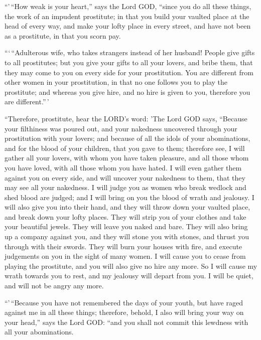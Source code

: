  ``'\,``How weak is your heart,'' says the Lord GOD,
``since you do all these things, the work of an impudent prostitute;
 in that you build your vaulted place at the head of
every way, and make your lofty place in every street, and have not been
as a prostitute, in that you scorn pay.

 ```\,``Adulterous wife, who takes strangers instead of
her husband!  People give gifts to all prostitutes; but
you give your gifts to all your lovers, and bribe them, that they may
come to you on every side for your prostitution.  You are
different from other women in your prostitution, in that no one follows
you to play the prostitute; and whereas you give hire, and no hire is
given to you, therefore you are different.''\,'

 ``Therefore, prostitute, hear the LORD's word:
 'The Lord GOD says, ``Because your filthiness was poured
out, and your nakedness uncovered through your prostitution with your
lovers; and because of all the idols of your abominations, and for the
blood of your children, that you gave to them;  therefore
see, I will gather all your lovers, with whom you have taken pleasure,
and all those whom you have loved, with all those whom you have hated. I
will even gather them against you on every side, and will uncover your
nakedness to them, that they may see all your nakedness. 
I will judge you as women who break wedlock and shed blood are judged;
and I will bring on you the blood of wrath and jealousy. 
I will also give you into their hand, and they will throw down your
vaulted place, and break down your lofty places. They will strip you of
your clothes and take your beautiful jewels. They will leave you naked
and bare.  They will also bring up a company against you,
and they will stone you with stones, and thrust you through with their
swords.  They will burn your houses with fire, and
execute judgements on you in the sight of many women. I will cause you
to cease from playing the prostitute, and you will also give no hire any
more.  So I will cause my wrath towards you to rest, and
my jealousy will depart from you. I will be quiet, and will not be angry
any more.

 ``'\,``Because you have not remembered the days of your
youth, but have raged against me in all these things; therefore, behold,
I also will bring your way on your head,'' says the Lord GOD: ``and you
shall not commit this lewdness with all your abominations.

